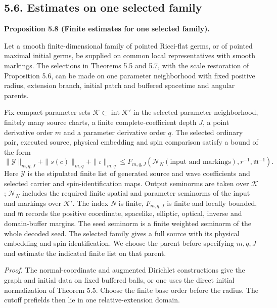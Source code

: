 \documentclass[
  english,
  11pt,
  reqno]{amsart}
\makeatletter
\newcommand{\paperdisplaynext}{%
  \let\paper@savedstartsection\@startsection
  \def\@startsection##1##2##3##4##5##6{%
    \let\@startsection\paper@savedstartsection
    \@tempskipa ##5\relax
    \ifdim\@tempskipa<\z@
      \def\paper@afterskip{.35\baselineskip}%
    \else
      \def\paper@afterskip{##5}%
    \fi
    \@startsection{##1}{##2}{##3}{##4}{\paper@afterskip}{##6}}}
\newcommand{\paperdisplaysection}{\paperdisplaynext\subsection}
\newcommand{\pandocstatementheading}[1]{%
  \par\if@nobreak\else
    \addpenalty{\@beginparpenalty}%
    \addvspace{.5\baselineskip plus .2\baselineskip minus .2\baselineskip}%
  \fi
  {\normalfont\bfseries #1\par}%
  \nobreak\@afterindenttrue\@afterheading
}
\let\paper@displaysection\paperdisplaysection
\renewcommand{\paperdisplaysection}[1]{%
  \let\paper@savedhangfrom\@hangfrom
  \long\def\@hangfrom##1##2{%
    \paper@savedhangfrom{##1}{\paper@headingparagraph##2}}%
  \paper@displaysection{#1}%
  \let\@hangfrom\paper@savedhangfrom}
\makeatother
\begin{document}
\paperdisplaysection{5.6. Estimates on one selected
family}\label{estimates-on-one-selected-family}\label{sec:submission-selected-family-estimates}

\pandocstatementheading{\leavevmode{}\label{prop:submission-coverage-family-estimates}Proposition 5.8 (Finite estimates for one selected family).}

Let a smooth finite-dimensional family of pointed Ricci-flat germs, or
of pointed maximal initial germs, be supplied on common local
representatives with smooth markings. The selections in Theorems 5.5 and
5.7, with the scale restoration of Proposition 5.6, can be made on one
parameter neighborhood with fixed positive radius, extension branch,
initial patch and buffered spacetime and angular parents.

Fix compact parameter sets
\(\mathcal K\subset\operatorname{int}\mathcal K'\) in the selected
parameter neighborhood, finitely many source charts, a finite
complete-coefficient depth \(J\), a point derivative order \(m\) and a
parameter derivative order \(q\). The selected ordinary pair, executed
source, physical embedding and spin comparison satisfy a bound of the
form%
 \[
\|\mathcal Y\|_{m,q,J}
+
\|s(c)\|_{m,q}
+
\|\iota\|_{m,q}
\le
F_{m,q,J}
\left(
\mathcal N_N(\text{input and markings}),
r^{-1},
\mathfrak m^{-1}
\right).
\] Here \(\mathcal Y\) is the stipulated finite list of generated source
and wave coefficients and selected carrier and spin-identification maps.
Output seminorms are taken over \(\mathcal K\); \(\mathcal N_N\)
includes the required finite spatial and parameter seminorms of the
input and markings over \(\mathcal K'\). The index \(N\) is finite,
\(F_{m,q,J}\) is finite and locally bounded, and \(\mathfrak m\) records
the positive coordinate, spacelike, elliptic, optical, inverse and
domain-buffer margins. The seed seminorm is a finite weighted seminorm
of the whole decoded seed. The selected family gives a full source with
its physical embedding and spin identification. We choose the parent
before specifying \(m,q,J\) and estimate the indicated finite list on
that parent.

\emph{Proof.} The normal-coordinate and augmented Dirichlet
constructions give the graph and initial data on fixed buffered balls,
or one uses the direct initial normalization of Theorem 5.5. Choose the
finite base order before the radius. The cutoff prefields then lie in
one relative-extension domain.
\end{document}
